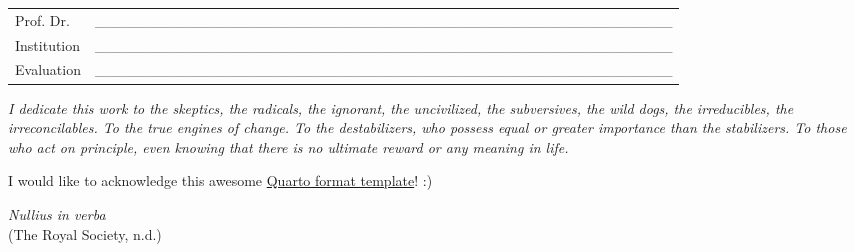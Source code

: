 \begin{folhadeaprovacao}
\vspace*{1cm}

\noindent
\begin{tabular}{m{2cm} P{14cm}}
  Prof. Dr. & \_\_\_\_\_\_\_\_\_\_\_\_\_\_\_\_\_\_\_\_\_\_\_\_\_\_\_\_\_\_\_\_\_\_\_\_\_\_\_\_\_\_\_\_\_\_\_\_\_\_\_\_\_\_\_ \\
  Institution & \_\_\_\_\_\_\_\_\_\_\_\_\_\_\_\_\_\_\_\_\_\_\_\_\_\_\_\_\_\_\_\_\_\_\_\_\_\_\_\_\_\_\_\_\_\_\_\_\_\_\_\_\_\_\_ \\
  Evaluation & \_\_\_\_\_\_\_\_\_\_\_\_\_\_\_\_\_\_\_\_\_\_\_\_\_\_\_\_\_\_\_\_\_\_\_\_\_\_\_\_\_\_\_\_\_\_\_\_\_\_\_\_\_\_\_ \\
\end{tabular}
\end{folhadeaprovacao}


\begin{dedicatoria}
  \vspace*{\fill}
  \centering
  \noindent
  \textit{
  I dedicate this work to the skeptics, the radicals, the ignorant, the uncivilized, the subversives, the wild dogs, the irreducibles, the irreconcilables. To the true engines of change. To the destabilizers, who possess equal or greater importance than the stabilizers. To those who act on principle, even knowing that there is no ultimate reward or any meaning in life.
  }
	\vspace*{\fill}
\end{dedicatoria}


\begin{agradecimentos}
  \noindent
  I would like to acknowledge this awesome \href{https://github.com/danielvartan/tesesusp}{Quarto format template}! :)
\end{agradecimentos}



\begin{epigrafe}
  \vspace*{\fill}
	\begin{flushright}
	  \textit{Nullius in verba} \\
		(The Royal Society, n.d.)
	\end{flushright}
\end{epigrafe}


